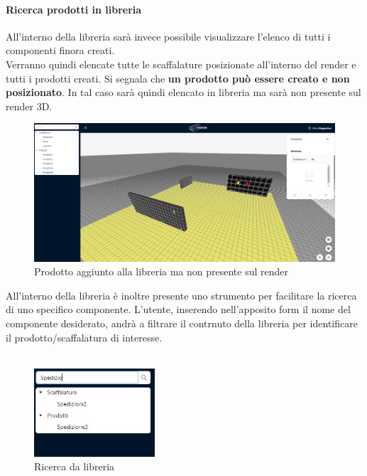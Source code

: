             \paragraph{Ricerca prodotti in libreria} \label{sec:principale:esplorare:ricerca}
                \noindent All'interno della libreria sarà invece possibile visualizzare l'elenco di tutti i componenti finora creati.\\
                Verranno quindi elencate tutte le scaffalature posizionate all'interno del render e tutti i prodotti creati. Si segnala che \textbf{un prodotto può essere creato
                e non posizionato}. In tal caso sarà quindi elencato in libreria ma sarà non presente sul render 3D.\\
                \begin{figure}[h!]
                    \centering
                    \includegraphics[width=1.0\textwidth]{images/prodotto_no_render.png}
                    \caption{Prodotto aggiunto alla libreria ma non presente sul render}
                \end{figure}
                
                \noindent All'interno della libreria è inoltre presente uno strumento per facilitare la ricerca di uno specifico componente. L'utente, inserendo nell'apposito
                form il nome del componente desiderato, andrà a filtrare il contrnuto della libreria per identificare il prodotto/scaffalatura di interesse. \\\
                \begin{figure}[h!]
                    \centering
                    \includegraphics[width=0.4\textwidth]{images/filtro_ricerca.png}
                    \caption{Ricerca da libreria}
                \end{figure}
                
